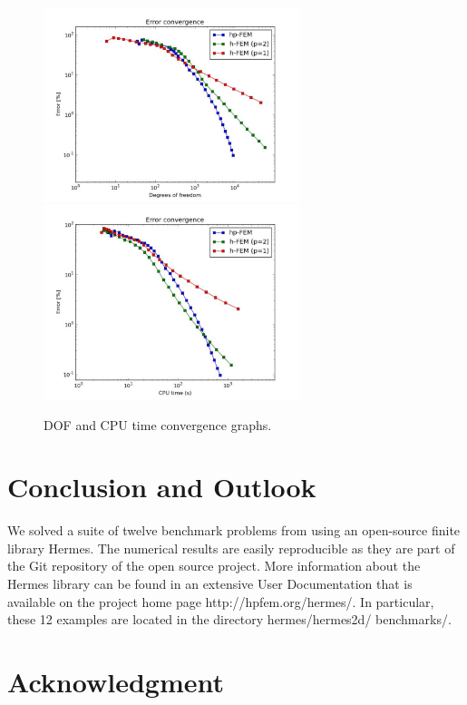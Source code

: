 \documentclass[12pt]{elsarticle}
\begin{document}
\begin{figure}[H]
\centering
\hspace{-50mm}
\includegraphics[width=7.5cm]{mafig75.pdf}\ \
\hspace{-10mm}
\includegraphics[width=7.5cm]{mafig76.pdf}
\hspace{-50mm}
\vspace{-2mm}
\caption{DOF and CPU time convergence graphs.}
\label{fig:nist-12-conv}
\end{figure}


\section{Conclusion and Outlook}
\label{sec:conclusion}

We solved a suite of twelve benchmark problems from \cite{mitchell-1}
using an open-source finite library Hermes. The numerical results are
easily reproducible as they are part of the Git repository of the
open source project. More information about the Hermes library can be found
in an extensive User Documentation that is available on the project home
page http://hpfem.org/hermes/. In particular, these 12 examples are located
in the directory hermes/hermes2d/ benchmarks/.

\section{Acknowledgment}
\end{document}
